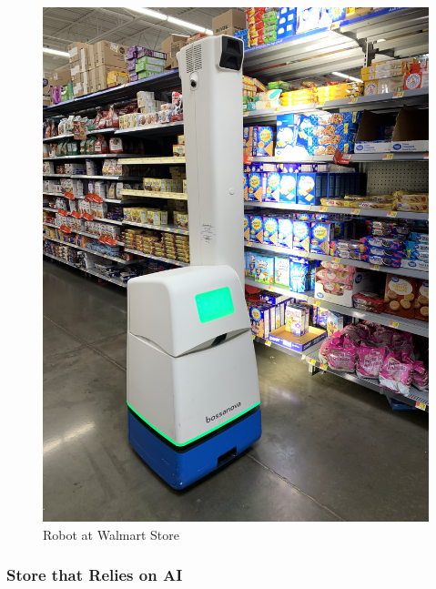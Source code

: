 \documentclass[
]{article}
\begin{document}
\begin{figure}
\centering
\includegraphics{Bossa_Nova_robot_scanning_shelf_at_Walmart.jpg}
\caption{Robot at Walmart Store}
\end{figure}

\hypertarget{store-that-relies-on-ai}{%
\subsubsection{Store that Relies on AI}\label{store-that-relies-on-ai}}
\end{document}

